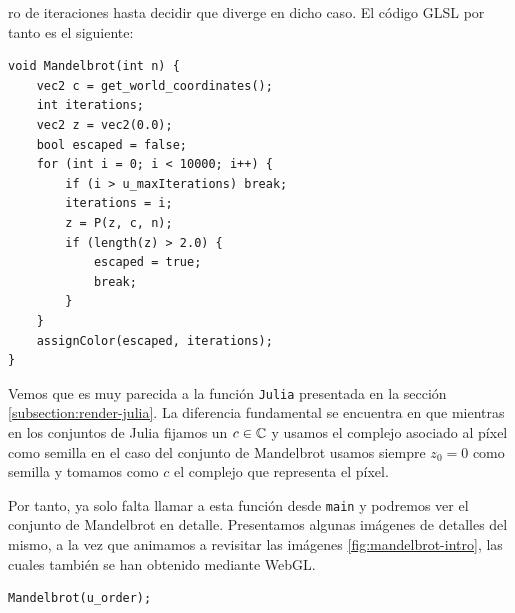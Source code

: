 ro de iteraciones hasta decidir que diverge en dicho caso. El código GLSL por tanto es el siguiente:

\begin{lstlisting}
void Mandelbrot(int n) {
    vec2 c = get_world_coordinates();
    int iterations;
    vec2 z = vec2(0.0);
    bool escaped = false;
    for (int i = 0; i < 10000; i++) {
        if (i > u_maxIterations) break;
        iterations = i;
        z = P(z, c, n);
        if (length(z) > 2.0) {
            escaped = true;
            break;
        }
    }
    assignColor(escaped, iterations);    
}
\end{lstlisting}

Vemos que es muy parecida a la función \verb|Julia| presentada en la sección \ref{subsection:render-julia}. La diferencia fundamental se encuentra en que mientras en los conjuntos de Julia fijamos un $c\in\mathbb{C}$ y usamos el complejo asociado al píxel como semilla en el caso del conjunto de Mandelbrot usamos siempre $z_0=0$ como semilla y tomamos como $c$ el complejo que representa el píxel.

Por tanto, ya solo falta llamar a esta función desde \verb|main| y podremos ver el conjunto de Mandelbrot en detalle. Presentamos algunas imágenes de detalles del mismo, a la vez que animamos a revisitar las imágenes \ref{fig:mandelbrot-intro}, las cuales también se han obtenido mediante WebGL.

\begin{lstlisting}
Mandelbrot(u_order);
\end{lstlisting}

